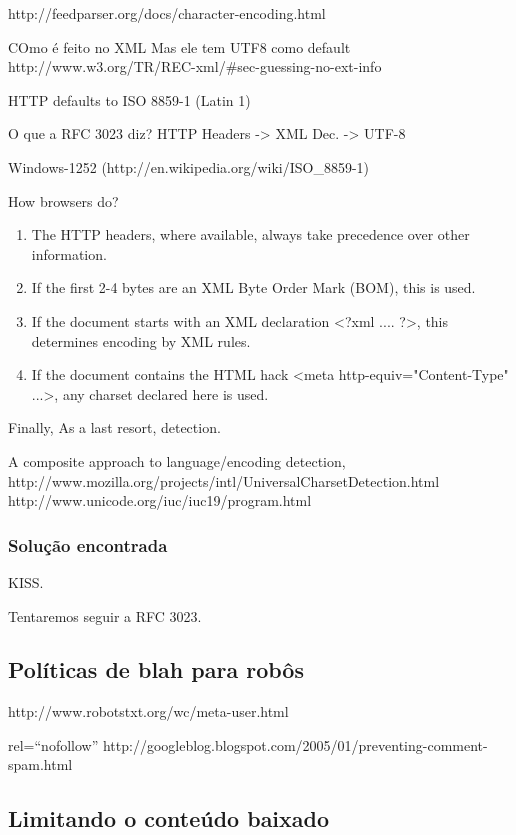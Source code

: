 \documentclass[10pt,twocolumn]{article}
\begin{document}
http://feedparser.org/docs/character-encoding.html

    COmo é feito no XML
        Mas ele tem UTF8 como default
        http://www.w3.org/TR/REC-xml/\#sec-guessing-no-ext-info

    HTTP defaults to ISO 8859-1 (Latin 1)

    O que a RFC 3023 diz? HTTP  Headers -> XML Dec. -> UTF-8


Windows-1252 (http://en.wikipedia.org/wiki/ISO\_8859-1)

How browsers do?

\begin{enumerate}
\item The HTTP headers, where available, always take precedence over other information.
\item  If the first 2-4 bytes are an XML Byte Order Mark (BOM), this is used.
\item  If the document starts with an XML declaration <?xml .... ?>, this determines encoding by XML rules.
 \item If the document contains the HTML hack <meta http-equiv="Content-Type" ...>, any charset declared here is used.
\end{enumerate}

Finally, As a last resort, detection.

A composite approach to language/encoding detection,
    http://www.mozilla.org/projects/intl/UniversalCharsetDetection.html
    http://www.unicode.org/iuc/iuc19/program.html

\subsubsection{Solução encontrada}

KISS.

Tentaremos seguir a RFC 3023.
\subsection{Políticas de blah para robôs}
http://www.robotstxt.org/wc/meta-user.html

rel=``nofollow'' http://googleblog.blogspot.com/2005/01/preventing-comment-spam.html  



\subsection{Limitando o conteúdo baixado}
\end{document}
